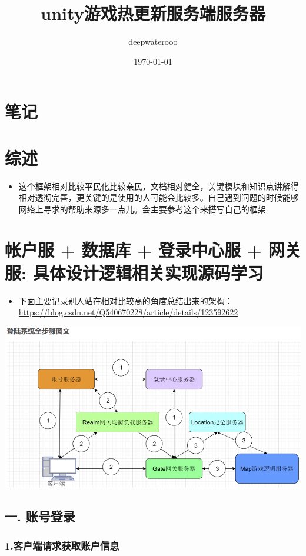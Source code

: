 \documentclass[9pt, b5paper]{article}
\author{deepwaterooo}
\date{\today}
\title{unity游戏热更新服务端服务器}
\begin{document}
\maketitle
\tableofcontents


\section{笔记}
\label{sec-1}
\section{综述}
\label{sec-2}
\begin{itemize}
\item 这个框架相对比较平民化比较亲民，文档相对健全，关键模块和知识点讲解得相对透彻完善，更关键的是使用的人可能会比较多。自己遇到问题的时候能够网络上寻求的帮助来源多一点儿。会主要参考这个来搭写自己的框架
\end{itemize}

\section{帐户服 + 数据库 + 登录中心服 + 网关服: 具体设计逻辑相关实现源码学习}
\label{sec-3}
\begin{itemize}
\item 下面主要记录别人站在相对比较高的角度总结出来的架构：\url{https://blog.csdn.net/Q540670228/article/details/123592622}
\end{itemize}

\includegraphics[width=.9\linewidth]{./pic/readme_20230124_102951.png}
\subsection{一. 账号登录}
\label{sec-3-1}
\subsubsection{1.客户端请求获取账户信息}
\label{sec-3-1-1}
\end{document}
